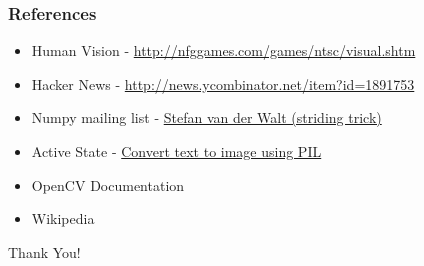 \documentclass[presentation]{beamer}
\begin{document}
\begin{frame}
\frametitle{References}
\label{sec-4_2}


\begin{itemize}
\item Human Vision - \href{http://nfggames.com/games/ntsc/visual.shtm}{http://nfggames.com/games/ntsc/visual.shtm}
\item Hacker News - \href{http://news.ycombinator.net/item?id=1891753}{http://news.ycombinator.net/item?id=1891753}
\item Numpy mailing list - \href{http://www.mail-archive.com/numpy-discussion@scipy.org/msg15594.html}{Stefan van der Walt (striding trick)}
\item Active State - \href{http://code.activestate.com/recipes/483756/}{Convert text to image using PIL}
\item OpenCV Documentation
\item Wikipedia
\end{itemize}
      \begin{center}
        \Huge{Thank You!}
      \end{center}
      
      \vspace{.5in}
      
      \begin{tiny}
        \begin{flushright}
          \color{blue}{Created using Emacs Org-mode}
        \end{flushright}
      \end{tiny}
      
\end{frame}
\end{document}
